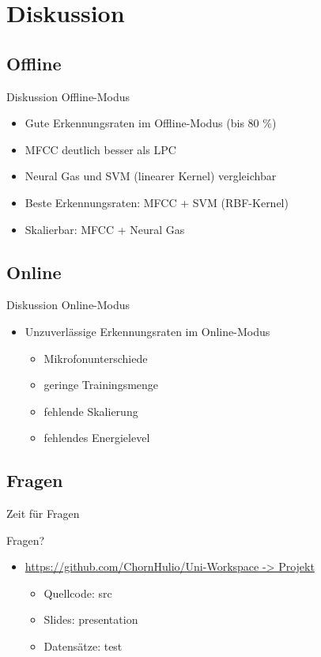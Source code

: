 \section{Diskussion}
\subsection{Offline}
\begin{frame}{Diskussion Offline-Modus}
	\begin{itemize}[<+->]
		\item Gute Erkennungsraten im Offline-Modus (bis 80 \%)
		\item MFCC deutlich besser als LPC
		\item Neural Gas und SVM (linearer Kernel) vergleichbar
		\item Beste Erkennungsraten: MFCC + SVM (RBF-Kernel)
		\item Skalierbar: MFCC + Neural Gas
	\end{itemize}
\end{frame}

\subsection{Online}
\begin{frame}{Diskussion Online-Modus}
	\begin{itemize}[<+->]
		\item Unzuverlässige Erkennungsraten im Online-Modus
		\begin{itemize}
			\item[\ding{229}] Mikrofonunterschiede
			\item[\ding{229}] geringe Trainingsmenge
			\item[\ding{229}] fehlende Skalierung
			\item[\ding{229}] fehlendes Energielevel
		\end{itemize}
	\end{itemize}
\end{frame}

\subsection{Fragen}
\begin{frame}{Zeit für Fragen}
	\begin{center}
		\Huge Fragen?
	\end{center}
	\begin{itemize}[<1->]
		\item \href{https://github.com/ChornHulio/Uni-Workspace/tree/master/Projekt}{https://github.com/ChornHulio/Uni-Workspace -> Projekt}
		\begin{itemize}[<1->]
			\item[\ding{229}] Quellcode: src
			\item[\ding{229}] Slides: presentation
			\item[\ding{229}] Datensätze: test
		\end{itemize}
	\end{itemize}
\end{frame}

